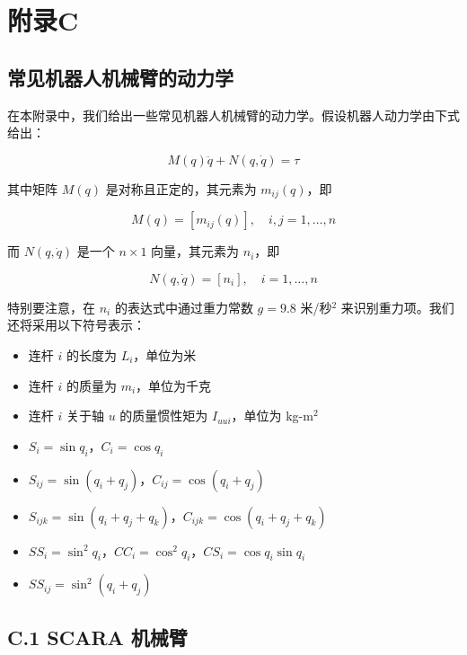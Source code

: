 \documentclass[UTF8]{ctexart}
\begin{document}
\section*{附录C}

\subsection*{常见机器人机械臂的动力学}

在本附录中，我们给出一些常见机器人机械臂的动力学。假设机器人动力学由下式给出：

\begin{equation}
M(q)\ddot{q} + N(q, \dot{q}) = \tau
\tag{C.1.1}
\end{equation}

其中矩阵 $M(q)$ 是对称且正定的，其元素为 $m_{ij}(q)$，即

\begin{equation}
M(q) = [m_{ij}(q)], \quad i,j = 1, \ldots, n
\end{equation}

而 $N(q, \dot{q})$ 是一个 $n \times 1$ 向量，其元素为 $n_i$，即

\begin{equation}
N(q, \dot{q}) = [n_i], \quad i = 1, \ldots, n
\end{equation}

特别要注意，在 $n_i$ 的表达式中通过重力常数 $g = 9.8$ 米/秒$^2$ 来识别重力项。我们还将采用以下符号表示：

\begin{itemize}
\item 连杆 $i$ 的长度为 $L_i$，单位为米
\item 连杆 $i$ 的质量为 $m_i$，单位为千克
\item 连杆 $i$ 关于轴 $u$ 的质量惯性矩为 $I_{uui}$，单位为 kg-m$^2$
\item $S_i = \sin q_i$，$C_i = \cos q_i$
\item $S_{ij} = \sin(q_i + q_j)$，$C_{ij} = \cos(q_i + q_j)$
\item $S_{ijk} = \sin(q_i + q_j + q_k)$，$C_{ijk} = \cos(q_i + q_j + q_k)$
\item $SS_i = \sin^2 q_i$，$CC_i = \cos^2 q_i$，$CS_i = \cos q_i \sin q_i$
\item $SS_{ij} = \sin^2(q_i + q_j)$
\end{itemize}

\subsection*{C.1 SCARA 机械臂}
\end{document}
